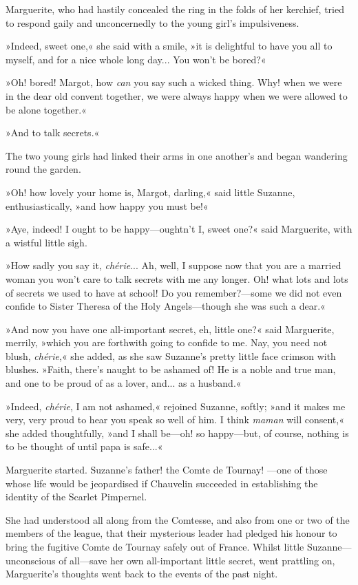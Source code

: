 Marguerite, who had hastily concealed the ring in the folds of her kerchief, tried to respond gaily and unconcernedly to the young girl's impulsiveness.

»Indeed, sweet one,« she said with a smile, »it is delightful to have you all to myself, and for a nice whole long day... You won't be bored?«

»Oh! bored! Margot, how \textit{can} you say such a wicked thing. Why! when we were in the dear old convent together, we were always happy when we were allowed to be alone together.«

»And to talk secrets.«

The two young girls had linked their arms in one another's and began wandering round the garden.

»Oh! how lovely your home is, Margot, darling,« said little Suzanne, enthusiastically, »and how happy you must be!«

»Aye, indeed! I ought to be happy\allowbreak---\allowbreak oughtn't I, sweet one?« said Marguerite, with a wistful little sigh.

»How sadly you say it, \textit{chérie}... Ah, well, I suppose now that you are a married woman you won't care to talk secrets with me any longer. Oh! what lots and lots of secrets we used to have at school! Do you remember?\allowbreak---\allowbreak some we did not even confide to Sister Theresa of the Holy Angels\allowbreak---\allowbreak though she was such a dear.«

»And now you have one all-important secret, eh, little one?« said Marguerite, merrily, »which you are forthwith going to confide to me. Nay, you need not blush, \textit{chérie},« she added, as she saw Suzanne's pretty little face crimson with blushes. »Faith, there's naught to be ashamed of! He is a noble and true man, and one to be proud of as a lover, and... as a husband.«

»Indeed, \textit{chérie}, I am not ashamed,« rejoined Suzanne, softly; »and it makes me very, very proud to hear you speak so well of him. I think \textit{maman} will consent,« she added thoughtfully, »and I shall be\allowbreak---\allowbreak oh! so happy\allowbreak---\allowbreak but, of course, nothing is to be thought of until papa is safe...«

Marguerite started. Suzanne's father! the Comte de Tournay! \allowbreak---\allowbreak one of those whose life would be jeopardised if Chauvelin succeeded in establishing the identity of the Scarlet Pimpernel.

She had understood all along from the Comtesse, and also from one or two of the members of the league, that their mysterious leader had pledged his honour to bring the fugitive Comte de Tournay safely out of France. Whilst little Suzanne\allowbreak---\allowbreak unconscious of all\allowbreak---\allowbreak save her own  all-important little secret, went prattling on, Marguerite's thoughts went back to the events of the past night.

